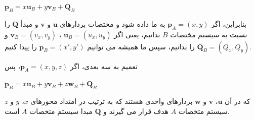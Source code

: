 {\begin{spacing}{1.5}
        \begin{center}
            $\textbf{p}_{B}=x\textbf{u}_{B}+y\textbf{v}_{B}+\textbf{Q}_{B}$
        \end{center}

        بنابراین، اگر $\textbf{p}_{A}=(x, y)$ به ما داده شود و مختصات بردارهای $\textbf{u}$ و $\textbf{v}$ و مبدأ $\textbf{Q}$ را نسبت به سیستم مختصات $B$ بدانیم، یعنی اگر $\textbf{u}_{B}=(u_{x}, u_{y})$ ، $\textbf{v}_{B}=(v_{x}, v_{y})$ و $\textbf{Q}_{B}=(Q_{x}, Q_{y})$ را بدانیم، سپس ما همیشه می توانیم $\textbf{p}_{B}=(x\prime, y\prime)$ را پیدا کنیم.

تعمیم به سه بعدی، اگر $\textbf{p}_{A}=(x, y, z)$، پس

        \begin{center}
            $\textbf{p}_{B}=x\textbf{u}_{B}+y\textbf{v}_{B}+z\textbf{w}_{B}+\textbf{Q}_{B}$
        \end{center}

        که در آن $\textbf{u}$، $\textbf{v}$ و $\textbf{w}$ بردارهای واحدی هستند که به ترتیب در امتداد محورهای $x$، $y$ و $z$ سیستم متخصات $A$ هدف قرار می گیرند و $\textbf{Q}$ مبدا سیستم متخصات $A$ است.
    \end{spacing}
}

